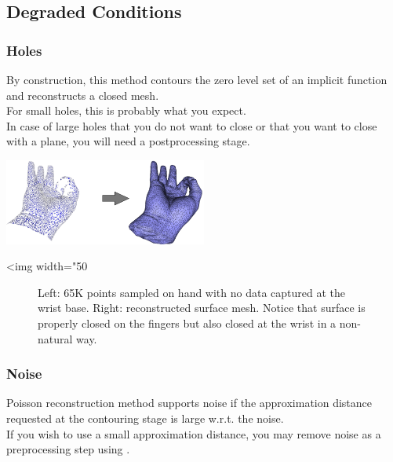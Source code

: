 \subsection{Degraded Conditions}

\subsubsection{Holes}

By construction, this method contours the zero level set of an implicit function and reconstructs a closed mesh.\\
For small holes, this is probably what you expect. \\
In case of large holes that you do not want to close or that you want to close with a plane, you will need a postprocessing stage.

\begin{center}
    \label{Surface_reconstruction_points_3-fig-holes_bad}
    \begin{ccTexOnly}
      \includegraphics[width=0.5\textwidth]{Surface_reconstruction_points_3/holes_bad} %
    \end{ccTexOnly}
    \begin{ccHtmlOnly}
        <img width="50%
    \end{ccHtmlOnly}
    \begin{figure}[h]
        \caption{Left: 65K points sampled on hand with no data captured at the wrist base.
                 Right: reconstructed surface mesh. Notice that surface is properly closed on the fingers
                 but also closed at the wrist in a non-natural way.}
    \end{figure}
\end{center}


\subsubsection{Noise}

Poisson reconstruction method supports noise if the approximation distance requested at the contouring stage is large w.r.t. the noise.\\
If you wish to use a small approximation distance, you may remove noise as a preprocessing step using .

